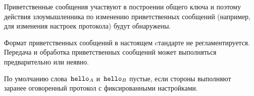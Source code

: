 Приветственные сообщения участвуют в построении общего ключа и поэтому действия
злоумышленника по изменению приветственных сообщений (например, для изменения
настроек протокола) будут обнаружены.

Формат приветственных сообщений в настоящем cтандарте не регламентируется.
Передача и обработка приветственных сообщений может выполняться предварительно
или неявно.

По умолчанию слова~$\texttt{hello}_A$ и~$\texttt{hello}_B$ пустые, если стороны выполняют
заранее оговоренный протокол с фиксированными настройками.

